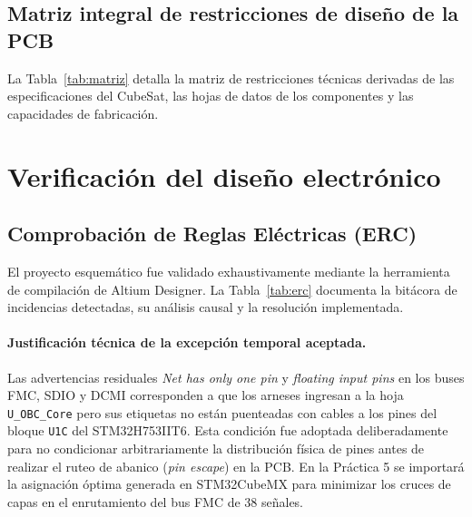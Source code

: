 \documentclass[11pt,a4paper]{article}
\begin{document}
\subsection{Matriz integral de restricciones de diseño de la PCB}
La Tabla~\ref{tab:matriz} detalla la matriz de restricciones técnicas derivadas de las especificaciones del CubeSat, las hojas de datos de los componentes y las capacidades de fabricación.


\label{tab:matriz}

\section{Verificación del diseño electrónico}

\subsection{Comprobación de Reglas Eléctricas (ERC)}
El proyecto esquemático fue validado exhaustivamente mediante la herramienta de compilación de Altium Designer. La Tabla~\ref{tab:erc} documenta la bitácora de incidencias detectadas, su análisis causal y la resolución implementada.


\label{tab:erc}

\paragraph{Justificación técnica de la excepción temporal aceptada.} Las advertencias residuales \emph{Net has only one pin} y \emph{floating input pins} en los buses FMC, SDIO y DCMI corresponden a que los arneses ingresan a la hoja \texttt{U\_OBC\_Core} pero sus etiquetas no están puenteadas con cables a los pines del bloque \texttt{U1C} del STM32H753IIT6. Esta condición fue adoptada deliberadamente para no condicionar arbitrariamente la distribución física de pines antes de realizar el ruteo de abanico (\emph{pin escape}) en la PCB. En la Práctica 5 se importará la asignación óptima generada en STM32CubeMX para minimizar los cruces de capas en el enrutamiento del bus FMC de 38 señales.
\end{document}
